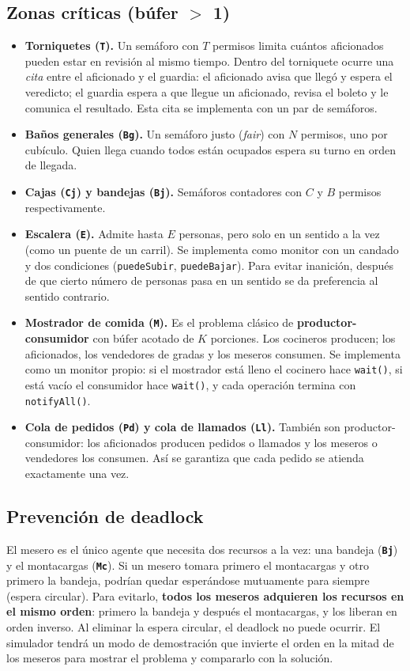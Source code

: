 \documentclass[11pt,letterpaper]{article}
\newcommand{\buf}[1]{\textbf{\texttt{#1}}}
\newcommand{\code}[1]{\texttt{#1}}
\begin{document}
\subsection{Zonas críticas (búfer $>$ 1)}
\begin{itemize}
  \item \textbf{Torniquetes (\buf{T}).} Un semáforo con $T$ permisos limita cuántos aficionados pueden estar en revisión al mismo tiempo. Dentro del torniquete ocurre una \emph{cita} entre el aficionado y el guardia: el aficionado avisa que llegó y espera el veredicto; el guardia espera a que llegue un aficionado, revisa el boleto y le comunica el resultado. Esta cita se implementa con un par de semáforos.
  \item \textbf{Baños generales (\buf{Bg}).} Un semáforo justo (\emph{fair}) con $N$ permisos, uno por cubículo. Quien llega cuando todos están ocupados espera su turno en orden de llegada.
  \item \textbf{Cajas (\buf{Cj}) y bandejas (\buf{Bj}).} Semáforos contadores con $C$ y $B$ permisos respectivamente.
  \item \textbf{Escalera (\buf{E}).} Admite hasta $E$ personas, pero solo en un sentido a la vez (como un puente de un carril). Se implementa como monitor con un candado y dos condiciones (\code{puedeSubir}, \code{puedeBajar}). Para evitar inanición, después de que cierto número de personas pasa en un sentido se da preferencia al sentido contrario.
  \item \textbf{Mostrador de comida (\buf{M}).} Es el problema clásico de \textbf{productor-consumidor} con búfer acotado de $K$ porciones. Los cocineros producen; los aficionados, los vendedores de gradas y los meseros consumen. Se implementa como un monitor propio: si el mostrador está lleno el cocinero hace \code{wait()}, si está vacío el consumidor hace \code{wait()}, y cada operación termina con \code{notifyAll()}.
  \item \textbf{Cola de pedidos (\buf{Pd}) y cola de llamados (\buf{Ll}).} También son productor-consumidor: los aficionados producen pedidos o llamados y los meseros o vendedores los consumen. Así se garantiza que cada pedido se atienda exactamente una vez.
\end{itemize}

\subsection{Prevención de deadlock}
El mesero es el único agente que necesita dos recursos a la vez: una bandeja (\buf{Bj}) y el montacargas (\buf{Mc}). Si un mesero tomara primero el montacargas y otro primero la bandeja, podrían quedar esperándose mutuamente para siempre (espera circular). Para evitarlo, \textbf{todos los meseros adquieren los recursos en el mismo orden}: primero la bandeja y después el montacargas, y los liberan en orden inverso. Al eliminar la espera circular, el deadlock no puede ocurrir. El simulador tendrá un modo de demostración que invierte el orden en la mitad de los meseros para mostrar el problema y compararlo con la solución.
\end{document}
